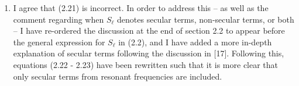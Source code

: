 \documentclass[11pt,letterpaper]{article}
\begin{document}
\begin{enumerate}
\begin{enumerate}
        \item I agree that (2.21) is incorrect. In order to address this -- as well as the comment regarding when $S_\ell$ denotes secular terms, non-secular terms, or both -- I have re-ordered the discussion at the end of section 2.2 to appear before the general expression for $S_\ell$ in (2.2), and I have added a more in-depth explanation of secular terms following the discussion in [17]. Following this, equations (2.22 - 2.23) have been rewritten such that it is more clear that only secular terms from resonant frequencies are included.
    \end{enumerate} 
\end{enumerate}
\end{document}
